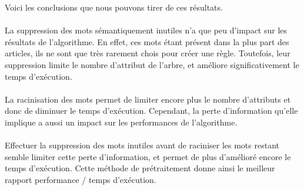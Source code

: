 Voici les conclusions que nous pouvons tirer de ces résultats.
\paragraph{}
La suppression des mots sémantiquement inutiles n’a que peu d’impact sur les résultats de l’algorithme. En effet, ces mots étant présent dans la plus part des articles, ils ne sont que très rarement chois pour créer une règle. Toutefois, leur suppression limite le nombre d’attribut de l’arbre, et améliore significativement le temps d’exécution.
\paragraph{}
La racinisation des mots permet de limiter encore plus le nombre d’attributs et donc de diminuer le temps d’exécution. Cependant, la perte d’information qu’elle implique a aussi un impact sur les performances de l’algorithme.
\paragraph{}
Effectuer la suppression des mots inutiles avant de raciniser les mots restant semble limiter cette perte d’information, et permet de plus d’amélioré encore le temps d’exécution. Cette méthode de prétraitement donne ainsi le meilleur rapport performance / temps d’exécution.

